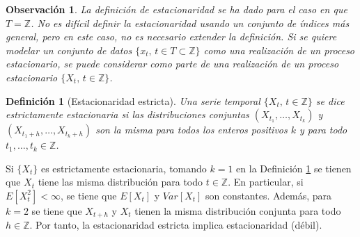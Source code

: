 \documentclass[12pt,twoside]{article}
\newtheorem{proposition}[theorem]{Proposición}
\newtheorem{definition}[theorem]{Definición}
\newtheorem{remark}[theorem]{Observación}
\newtheorem{proof}[theorem]{Demostración.}
\renewenvironment{proof}{\emph{Demostración.}} {\quad \hfill $\blacksquare$ \newline} %
\newcommand{\abs}[1]{\ensuremath{|#1|}}
\begin{document}
\begin{remark}
    La definición de estacionaridad se ha dado para el caso en que $T = \mathbb{Z}$. No es difícil definir la estacionaridad usando un conjunto de índices más general, pero en este caso, no es necesario extender la definición. Si se quiere modelar un conjunto de datos $\{x_t, \, t\in T \subset \mathbb{Z}\}$ como una realización de un proceso estacionario, se puede considerar como parte de una realización de un proceso estacionario $\{X_t, \, t \in \mathbb{Z}\}$.
\end{remark}

\begin{definition}[Estacionaridad estricta]\label{def:strictly_stationary}
    Una serie temporal $\{X_t, \,t \in \mathbb{Z}\}$ se dice estrictamente estacionaria si las distribuciones conjuntas $(X_{t_1}, \dotsc, X_{t_k})$ y $(X_{t_1+h}, \dotsc, X_{t_k+h})$ son la misma para todos los enteros positivos $k$ y para todo $t_1, \dotsc, t_k \in \mathbb{Z}$. 
\end{definition}

Si $\{X_t\}$ es estrictamente estacionaria, tomando $k=1$ en la Definición \ref{def:strictly_stationary} se tienen que $X_t$ tiene las misma distribución para todo $t \in \mathbb{Z}$. En particular, si $E[X_t^2] < \infty$, se tiene que $E[X_t]$ y $Var[X_t]$ son constantes. Además, para $k=2$ se tiene que $X_{t+h}$ y $X_t$ tienen la misma distribución conjunta para todo $h\in\mathbb{Z}$. Por tanto, la estacionaridad estricta implica estacionaridad (débil).

            
\end{document}
